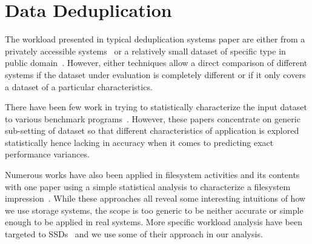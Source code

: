 \section{Data Deduplication}

The workload presented in typical deduplication systems paper are either from a privately accessible systems~\cite{clements:2009, rhea:2008, manber:1994, aronovich:2009, lillibridge:2009, zhu:2008} or a relatively small dataset of specific type in public domain~\cite{storer:2008, kruus:2010, eshghi:2005}. 
However, either techniques allow a direct comparison of different systems if the dataset under evaluation is completely different or if it only covers a dataset of a particular characteristics.

There have been few work in trying to statistically characterize the input dataset to various benchmark programs~\cite{eeckhout:2003, yi:2002, hsu:2002}. 
However, these papers concentrate on generic sub-setting of dataset so that different characteristics of application is explored statistically hence lacking in accuracy when it comes to predicting exact performance variances.

Numerous works have also been applied in filesystem activities and its contents~\cite{douceur:1999, leung:2008, douceur:1999} with one paper using a simple statistical analysis to characterize a filesystem impression~\cite{agrawal:2009}. 
While these approaches all reveal some interesting intuitions of how we use storage systems, the scope is too generic to be neither accurate or simple enough to be applied in real systems. 
More specific workload analysis have been targeted to SSDs~\cite{soundararajan:2010} and we use some of their approach in our analysis.
